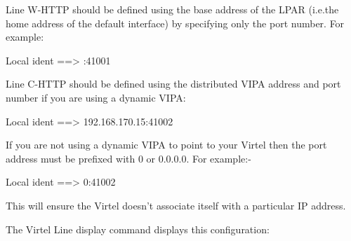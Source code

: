 \documentclass[letterpaper,10pt,english]{sphinxmanual}
\begin{document}
Line W-HTTP should be defined using the base address of the LPAR (i.e.the home address of the default interface) by specifying only the port number. For example:

Local ident ==\textgreater{} :41001

Line C-HTTP should be defined using the distributed VIPA address and port number if you are using a dynamic VIPA:

Local ident ==\textgreater{} 192.168.170.15:41002

If you are not using a dynamic VIPA to point to your Virtel then the port address must be prefixed with 0 or 0.0.0.0. For example:-

Local ident ==\textgreater{} 0:41002

This will ensure the Virtel doesn’t associate itself with a particular IP address.

The Virtel Line display command displays this configuration:

\begin{sphinxVerbatim}[commandchars=\\\{\}]
 
 
    
      
    
    
    
   
\end{sphinxVerbatim}
\end{document}
